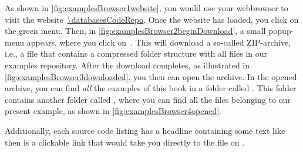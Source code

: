 As shown in \cref{fig:examplesBrowser1website}, you would use your  webbrowser to visit the website~\expandafter\url{\databasesCodeRepo}.
Once the website has loaded, you click on the green  menu.
Then, in \cref{fig:examplesBrowser2beginDownload}, a small popup-menu appears, where you click on~.
This will download a so-called ZIP-archive, i.e., a file that contains a compressed folder structure with all files in our examples repository.
After the download completes, as illustrated in \cref{fig:examplesBrowser3downloaded}, you then can open the archive.
In the opened archive, you can find \emph{all} the examples of this book in a folder called .
This folder contains another folder called , where you can find all the files belonging to our present example, as shown in \cref{fig:examplesBrowser4opened}.

Additionally, each source code listing has a headline containing some text like~
 then is a clickable link that would take you directly to the file on \github.%
%
\FloatBarrier%
\endhsection%
%
